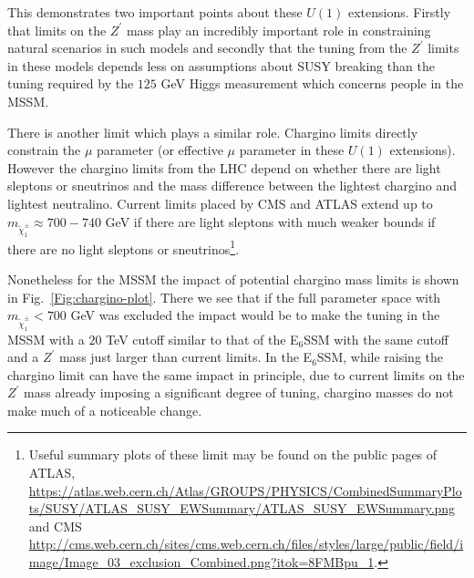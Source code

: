 \documentclass[preprint,amsmath,amssymb,aps,superscriptaddress,prd,
showpacs,floatfix,nofootinbib]{revtex4-1}
\begin{document}
This demonstrates two important points about these $U(1)$
extensions.  Firstly that limits on the $Z^\prime$ mass play an
incredibly important role in constraining natural scenarios in such
models and secondly that the tuning from the $Z^\prime$ limits in
these models depends less on assumptions about SUSY breaking than the
tuning required by the $125$ GeV Higgs measurement which concerns
people in the MSSM.

There is another limit which plays a similar role.  Chargino limits
directly constrain the $\mu$ parameter (or effective $\mu$ parameter
in these $U(1)$ extensions).  However the chargino limits from the LHC
depend on whether there are light sleptons or sneutrinos and the mass
difference between the lightest chargino and lightest neutralino.
Current limits placed by CMS and ATLAS extend up to
$m_{\tilde{\chi}^\pm_1} \approx 700 - 740$ GeV if there are light
sleptons \cite{Khachatryan:2014qwa, Aad:2014nua} with much weaker
bounds if there are no light sleptons or sneutrinos\footnote{Useful
summary plots of these limit may be found on the public pages of
ATLAS, \url{https://atlas.web.cern.ch/Atlas/GROUPS/PHYSICS/CombinedSummaryPlots/SUSY/ATLAS_SUSY_EWSummary/ATLAS_SUSY_EWSummary.png}
and CMS \url{http://cms.web.cern.ch/sites/cms.web.cern.ch/files/styles/large/public/field/image/Image_03_exclusion_Combined.png?itok=8FMBpu_1}.}.

Nonetheless for the MSSM the impact of potential chargino mass limits is
shown in Fig.~\ref{Fig:chargino-plot}.  There we see that if the
full parameter space with $m_{\tilde{\chi}^\pm_1} < 700$ GeV was excluded the
impact would be to make the tuning in the MSSM with a $20$ TeV cutoff
similar to that of the E$_6$SSM with the same cutoff and a
$Z^\prime$ mass just larger than current limits.  In the E$_6$SSM,
while raising the chargino limit can have the same impact in
principle, due to current limits on the $Z^\prime$ mass already
imposing a significant degree of tuning, chargino masses do not make
much of a noticeable change.
\end{document}
